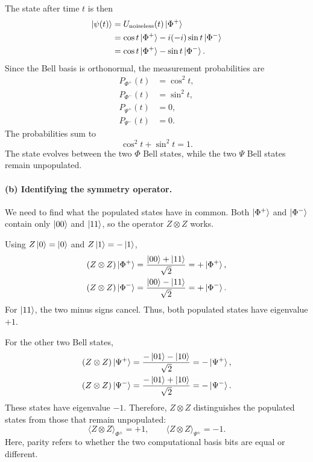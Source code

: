 \documentclass[11pt]{article}
\begin{document}
The state after time $t$ is then
\[
\begin{aligned}
\ket{\psi(t)}
&=U_{\mathrm{noiseless}}(t)\ket{\Phi^+}\\
&=\cos t\ket{\Phi^+}
-i(-i)\sin t\ket{\Phi^-}\\
&=\cos t\ket{\Phi^+}-\sin t\ket{\Phi^-}.
\end{aligned}
\]
Since the Bell basis is orthonormal, the measurement
probabilities are
\[
\boxed{
\begin{aligned}
P_{\Phi^+}(t)&=\cos^2 t,\\
P_{\Phi^-}(t)&=\sin^2 t,\\
P_{\Psi^+}(t)&=0,\\
P_{\Psi^-}(t)&=0.
\end{aligned}
}
\]
The probabilities sum to
\[
\cos^2 t+\sin^2 t=1.
\]
The state evolves between the two $\Phi$ Bell states,
while the two $\Psi$ Bell states remain unpopulated.


\paragraph{(b) Identifying the symmetry operator.}
We need to find what the populated states have in
common. Both $\ket{\Phi^+}$ and $\ket{\Phi^-}$ contain
only $\ket{00}$ and $\ket{11}$, so the operator
$Z\otimes Z$ works.

Using $Z\ket{0}=\ket{0}$ and $Z\ket{1}=-\ket{1}$,
\[
\begin{aligned}
(Z\otimes Z)\ket{\Phi^+}
&=
\frac{\ket{00}+\ket{11}}{\sqrt{2}}
=+\ket{\Phi^+},\\
(Z\otimes Z)\ket{\Phi^-}
&=
\frac{\ket{00}-\ket{11}}{\sqrt{2}}
=+\ket{\Phi^-}.
\end{aligned}
\]
For $\ket{11}$, the two minus signs cancel.
Thus, both populated states have eigenvalue $+1$.

For the other two Bell states,
\[
\begin{aligned}
(Z\otimes Z)\ket{\Psi^+}
&=
\frac{-\ket{01}-\ket{10}}{\sqrt{2}}
=-\ket{\Psi^+},\\
(Z\otimes Z)\ket{\Psi^-}
&=
\frac{-\ket{01}+\ket{10}}{\sqrt{2}}
=-\ket{\Psi^-}.
\end{aligned}
\]
These states have eigenvalue $-1$. Therefore,
$Z\otimes Z$ distinguishes the populated states
from those that remain unpopulated:
\[
\boxed{
\langle Z\otimes Z\rangle_{\Phi^\pm}=+1,
\qquad
\langle Z\otimes Z\rangle_{\Psi^\pm}=-1.
}
\]
Here, parity refers to whether the two computational
basis bits are equal or different.
\end{document}
